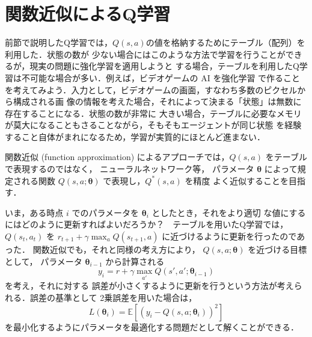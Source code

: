 \section{関数近似によるQ学習}

前節で説明したQ学習では，$Q(s,a)$の値を格納するためにテーブル（配列）を利用した．状態の数が
少ない場合にはこのような方法で学習を行うことができるが，現実の問題に強化学習を適用しようと
する場合，テーブルを利用したQ学習は不可能な場合が多い．例えば，ビデオゲームの AI を強化学習
で作ることを考えてみよう．入力として，ビデオゲームの画面，すなわち多数のピクセルから構成される画
像の情報を考えた場合，それによって決まる「状態」は無数に存在することになる．状態の数が非常に
大きい場合，テーブルに必要なメモリが莫大になることもさることながら，そもそもエージェントが同じ状態
を経験すること自体がまれになるため，学習が実質的にほとんど進まない．

関数近似 (function approximation) によるアプローチでは，$Q(s,a)$ をテーブルで表現するのではなく，
ニューラルネットワーク等，
パラメータ $\boldsymbol{\theta}$ によって規定される関数 $Q(s,a; \boldsymbol{\theta})$ で表現し，$Q^*(s,a)$ を精度
よく近似することを目指す．

いま，ある時点 $i$ でのパラメータを $\boldsymbol{\theta}_i$ としたとき，それをより適切
な値にするにはどのように更新すればよいだろうか？　テーブルを用いたQ学習では，
$Q(s_t, a_t)$ を $r_{t+1} + \gamma \max_a Q(s_{t+1},a)$ に近づけるように更新を行ったのであった．
関数近似でも，それと同様の考え方により， $Q(s,a; \boldsymbol{\theta})$ を近づける目標として，
パラメータ $\boldsymbol{\theta}_{i-1}$ から計算される
\begin{equation}
y_i = r + \gamma \max_{a'} Q(s', a'; \boldsymbol{\theta}_{i-1})
\end{equation}
 を考え，それに対する
誤差が小さくするように更新を行うという方法が考えられる．誤差の基準として
2乗誤差を用いた場合は， 
\begin{equation}
L(\boldsymbol{\theta}_i) =  \mathbb{E}[ (y_i - Q(s,a; \boldsymbol{\theta}_i))^2 ]
\end{equation}
を最小化するようにパラメータを最適化する問題だとして解くことができる．



